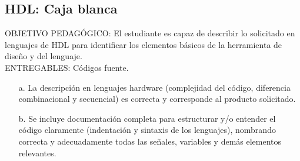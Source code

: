 \subsection{HDL: Caja blanca}
\scriptsize
	\begin{tcolorbox}[enhanced,title=PRODUCTO DE CALIDAD:,colframe=colorA1,colback=colorA2,arc=0mm,colbacktitle=white,fonttitle=\bfseries,coltitle=white,attach boxed title to top left={xshift=3.2mm,yshift=-0.50mm},boxed title style={skin=enhancedfirst jigsaw,size=small,arc=0mm,bottom=1mm,interior style={fill=none,top color=color2,bottom color=color2},,boxrule=0pt},boxrule=0pt]
		OBJETIVO PEDAGÓGICO: El estudiante es capaz de describir lo solicitado en lenguajes de HDL para identificar los elementos básicos de la herramienta de diseño y del lenguaje. \\
		ENTREGABLES: Códigos fuente.
		\begin{enumerate}
			\item[a.] La descripción en lenguajes hardware (complejidad del código, diferencia combinacional y secuencial) es correcta y corresponde al producto solicitado.
			\item[b.] Se incluye documentación completa para estructurar y/o entender el código claramente (indentación y sintaxis de los lenguajes), nombrando correcta y adecuadamente todas las señales, variables y demás elementos relevantes.  
		\end{enumerate}
	\end{tcolorbox}

\normalsize

	
